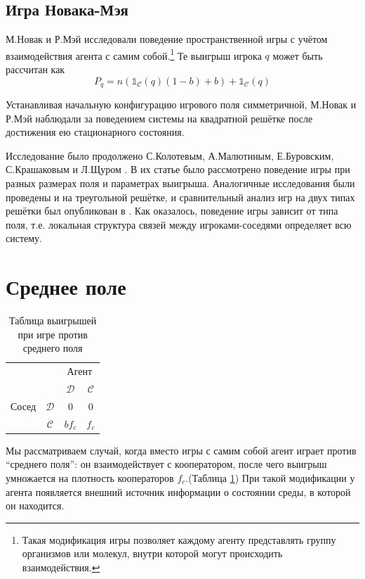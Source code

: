 \documentclass[12pt]{article}
\begin{document}
\subsection*{Игра Новака-Мэя}
    М.Новак и Р.Мэй\cite{NOWAK1992,NOWAK1993} исследовали поведение пространственной игры с учётом взаимодействия агента с самим собой.\footnote{Такая модификация игры позволяет каждому агенту представлять группу организмов или молекул, внутри которой могут происходить взаимодействия.} Те выигрыш игрока $q$ может быть рассчитан как
    \begin{equation*}
        P_q = n(\mathds{1}_{\mathcal{C}}(q)(1-b) + b) + \mathds{1}_{\mathcal{C}}(q)
    \end{equation*}
        
    Устанавливая начальную конфигурацию  игрового поля симметричной, М.Новак и Р.Мэй наблюдали за поведением системы на квадратной решётке после достижения ею стационарного состояния.
    
    Исследование было продолжено С.Колотевым, А.Малютиным, Е.Буровским, С.Крашаковым и Л.Щуром \cite{KOLOTEV2018}. В их статье было рассмотрено поведение игры при разных размерах поля и параметрах выигрыша. Аналогичные исследования были проведены и на треугольной решётке, и сравнительный анализ игр на двух типах решётки был опубликован в \cite{sq_and_tr}. Как оказалось, поведение игры зависит от типа поля, т.е. локальная структура связей между игроками-соседями определяет всю систему.
 
\section{Среднее поле}
    \begin{table}[h!]\centering
        \begin{tabular}{cc|c|c|}
              & \multicolumn{1}{c}{} & \multicolumn{2}{c}{Агент}\\
              & \multicolumn{1}{c}{} & \multicolumn{1}{c}{$\mathcal{D}$}  & \multicolumn{1}{c}{$\mathcal{C}$} \\\cline{3-4}
              {Сосед}  & $\mathcal{D}$ & $0$ & $0$ \\\cline{3-4}
              & $\mathcal{C}$ & $bf_c$ & $f_c$ \\\cline{3-4}
        \end{tabular}
        \caption{Таблица выигрышей при игре против среднего поля}
        \label{table:gametable2}
    \end{table}
    Мы рассматриваем случай, когда вместо игры с самим собой агент играет против “среднего поля”: он взаимодействует с кооператором, после чего выигрыш умножается на плотность кооператоров $f_c$.(Таблица \ref{table:gametable2}) При такой модификации у агента появляется внешний источник информации о состоянии среды, в которой он находится.
\end{document}
